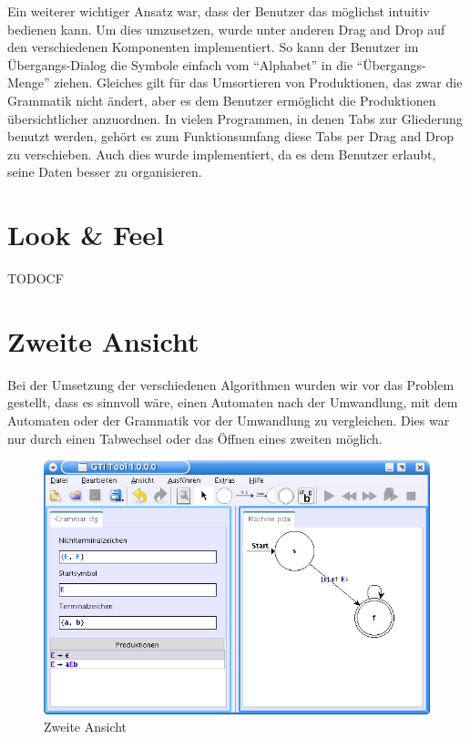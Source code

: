 Ein weiterer wichtiger Ansatz war, dass der Benutzer das \gtitool möglichst
intuitiv bedienen kann. Um dies umzusetzen, wurde unter anderen Drag and Drop
auf den verschiedenen Komponenten implementiert. So kann der Benutzer im
Übergangs-Dialog die Symbole einfach vom "`Alphabet"' in die
"`Übergangs-Menge"' ziehen. Gleiches gilt für das Umsortieren von Produktionen,
das zwar die Grammatik nicht ändert, aber es dem Benutzer ermöglicht die
Produktionen übersichtlicher anzuordnen. In vielen Programmen, in denen Tabs
zur Gliederung benutzt werden, gehört es zum Funktionsumfang diese Tabs per Drag
and Drop zu verschieben. Auch dies wurde implementiert, da es dem Benutzer
erlaubt, seine Daten besser zu organisieren.


\section{Look \& Feel}\label{LookAndFeel}

TODOCF


\section{Zweite Ansicht}\label{SecondView}

Bei der Umsetzung der verschiedenen Algorithmen wurden wir vor das Problem
gestellt, dass es sinnvoll wäre, einen Automaten nach der Umwandlung, mit dem
Automaten oder der Grammatik vor der Umwandlung zu vergleichen. Dies war nur
durch einen Tabwechsel oder das Öffnen eines zweiten \gtitools
möglich.\vspace{10pt}

\begin{figure}[h!]
\begin{center}
\includegraphics[width=12cm]{../images/second_view.png}
\caption{Zweite Ansicht}
\end{center}
\end{figure}

